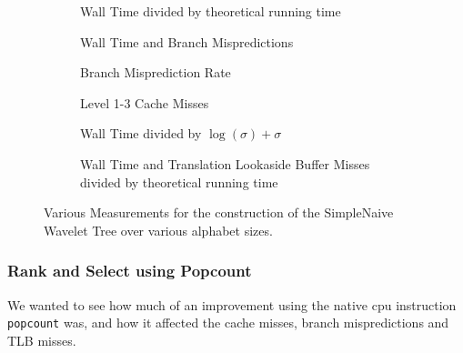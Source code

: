 \begin{figure}\tiny
	\begin{subfigure}{0.48\textwidth}
		
		\caption{Wall Time divided by theoretical running time}
		\label{fig:naiveIntegerAlphabetSize_WallTime}
	\end{subfigure}
	\hfill
	\begin{subfigure}{0.48\textwidth}
		
		\caption{Wall Time and Branch Mispredictions}
		\label{fig:naiveIntegerAlphabetSize_WallTime_BM}
	\end{subfigure}	
	
	\begin{subfigure}{0.48\textwidth}
		
		\caption{Branch Misprediction Rate}
		\label{fig:naiveIntegerAlphabetSize_BMRate}
	\end{subfigure}
	\hfill
	\begin{subfigure}{0.48\textwidth}
		
		\caption{Level 1-3 Cache Misses}
		\label{fig:naiveIntegerAlphabetSize_CM}
	\end{subfigure}
	
	\begin{subfigure}{0.48\textwidth}
		
		\caption{Wall Time divided by $\log(\sigma) + \sigma$}
		\label{fig:naiveIntegerAlphabetSize_WallTime_plusSigma}
	\end{subfigure}
	\hfill
	\begin{subfigure}{0.48\textwidth}
		
		\caption{Wall Time and Translation Lookaside Buffer Misses divided by theoretical running time}
		\label{fig:naiveIntegerAlphabetSize_WallTime_TLB}
	\end{subfigure}
	\caption{Various Measurements for the construction of the SimpleNaive Wavelet Tree over various alphabet sizes.}
	\label{fig:naiveIntegerAlphabetSize}
\end{figure}
\restoregeometry




\subsubsection{Rank and Select using Popcount}
\label{sec:experimentPopcountRankSelect}
We wanted to see how much of an improvement using the native cpu instruction \texttt{popcount} was, and how it affected the cache misses, branch mispredictions and TLB misses.



